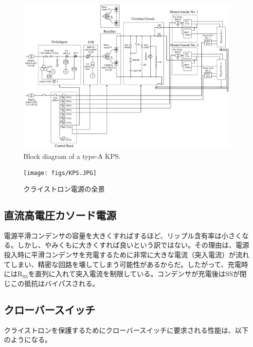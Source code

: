 \documentclass[book,openany]{jlreq}
\theoremstyle{definition}
\begin{document}
\begin{figure}[!htt]
    \begin{center}
        \includegraphics[width=\linewidth]{figs/skeleton-diagram.pdf}
        \caption{Block diagram of a type-A KPS.}
        \label{f02-02}
    \end{center}
\end{figure}

\begin{figure}[!htt]
    \begin{center}
        \texttt{[image: figs/KPS.JPG]}
        \caption{クライストロン電源の全景}
        \label{kps_photo}
    \end{center}
\end{figure}

\subsection{直流高電圧カソード電源}
電源平滑コンデンサの容量を大きくすればするほど、リップル含有率は小さくなる。しかし、やみくもに大きくすれば良いという訳ではない。その理由は、電源投入時に平滑コンデンサを充電するために非常に大きな電流（突入電流）が流れてしまい、精密な回路を壊してしまう可能性があるからだ。したがって、充電時には$\mathrm{R_{SS}}$を直列に入れて突入電流を制限している。コンデンサが充電後はSSが閉じこの抵抗はバイパスされる。


\subsection{クローバースイッチ}
クライストロンを保護するためにクローバースイッチに要求される性能は、以下のようになる。
\end{document}
